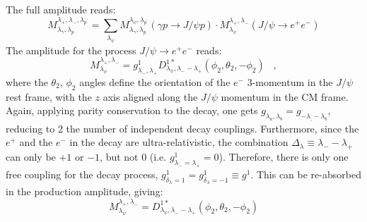 \documentclass[a4paper,10pt]{article}
\begin{document}
The full amplitude reads:
\begin{equation}
M_{\lambda_\gamma,\lambda_p}^{\lambda_+,\lambda_-,\lambda_{p^{\prime}}} = \sum_{\lambda_\psi} M_{\lambda_\gamma,\lambda_p}^{\lambda_\psi,\lambda_{p^{\prime}}}(\gamma p \rightarrow J/\psi p) \cdot M_{\lambda_\psi}^{\lambda_+,\lambda_-}(J/\psi \rightarrow e^+ e^-)
\end{equation}
The amplitude for the process $J/\psi \rightarrow e^+ e^-$ reads:
\begin{equation}
M_{\lambda_\psi}^{\lambda_+,\lambda_-} = g^{1}_{\lambda_-,\lambda_+}D^{1*}_{\lambda_\psi,\lambda_--\lambda_+}(\phi_2,\theta_2,-\phi_2) \; \; \; ,
\end{equation}
where the $\theta_2$, $\phi_2$ angles define the orientation of the $e^-$ 3-momentum in the $J/\psi$ rest frame, with the $z$ axis aligned along the $J/\psi$ momentum in the CM frame.
Again, applying parity conservation to the decay, one gets $g_{\lambda_a,\lambda_b}=g_{-\lambda_,-\lambda_b}$, reducing to 2 the number of independent decay couplings. Furthermore, since the $e^+$ and the $e^-$ in the decay are ultra-relativistic, the combination $\Delta_\lambda \equiv \lambda_--\lambda_+$ can only be $+1$ or $-1$, but not 0 (i.e. $g^1_{\lambda_-=\lambda_+}=0$). Therefore, there is only one free coupling for the decay process, $g^1_{\delta_\lambda=1} = g^1_{\delta_\lambda=-1} \equiv g^1$. 
This can be re-absorbed in the production amplitude, giving: 
\begin{equation}
M_{\lambda_\psi}^{\lambda_+,\lambda_-} = D^{1*}_{\lambda_\psi,\lambda_--\lambda_+}(\phi_2,\theta_2,-\phi_2) 
\end{equation}
\end{document}
